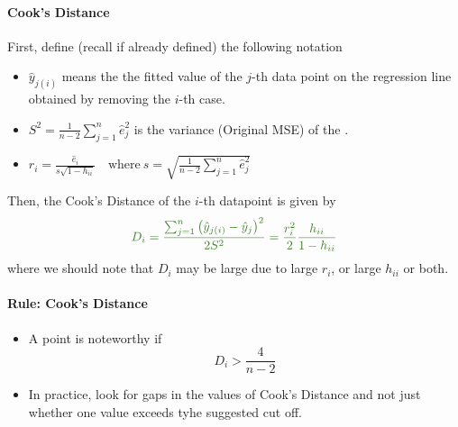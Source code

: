 \documentclass[11pt]{article}
\begin{document}
\paragraph{Cook's Distance} First, define (recall if already defined) the following notation
\begin{itemize}
    \item $\hat{{y}}_{j(i)}$ means the the fitted value of the $j$-th data point on the regression line obtained by removing the $i$-th case. 
    \item $S^2 = \frac{1}{n-2} \sum_{j=1}^n \hat{e}_j^2$ is the variance (Original MSE) of the \color{Thistle}{total regression model}. \color{black}
    \item $r_{i}=\frac{\hat{e}_{i}}{s \sqrt{1-h_{i i}}}\quad \text{where}~ s=\sqrt{\frac{1}{n-2} \sum_{j=1}^{n} \hat{e}_{j}^{2}}$
\end{itemize}
Then, the Cook's Distance of the $i$-th datapoint is given by
\begin{equation*}
    \color{OliveGreen}
    D_{i}=\frac{\sum_{j=1}^{n}\left(\hat{y}_{j(i)}-\hat{y}_{j}\right)^{2}}{2 S^{2}} = \frac{r_{i}^{2}}{2} \frac{h_{i i}}{1-h_{i i}}
\end{equation*}
where we should note that $D_i$ may be large due to large $r_i$, or large $h_{ii}$ or both.

\paragraph{Rule: Cook's Distance} 
\begin{itemize}
    \item A point is noteworthy if
        \begin{equation*}
            D_i > \frac{4}{n-2}
        \end{equation*}
    \item In practice, look for gaps in the values of Cook's Distance and not just whether one value exceeds tyhe suggested cut off.
\end{itemize}
\end{document}
